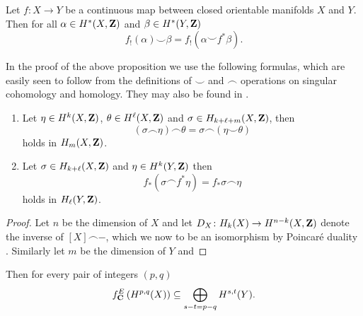 \begin{proposition}
    \label{cohomological projection formula}
    Let $f \colon X \to Y$ be a continuous map between closed orientable manifolds $X$ and $Y$. Then for all $\alpha \in H^{*}(X, \mathbf Z)$ and $\beta \in H^{*}(Y, \mathbf Z)$
    \[
        f_!(\alpha) \smallsmile \beta = f_!(\alpha \smallsmile f^*\beta).
    \]
\end{proposition}

\begin{remark}
    In the proof of the above proposition we use the following formulas, which are easily seen to follow from the definitions of $\smallsmile$ and $\smallfrown$ operations on singular cohomology and homology. They may also be found in \cite[\S VI, Theorem 5.2]{Bredon1993}.
    \begin{enumerate}[label = (\roman*)]
        \item{Let $\eta \in H^{k}(X, \mathbf Z)$, $\theta \in H^{\ell}(X, \mathbf Z)$ and $\sigma \in H_{k+\ell+m}(X, \mathbf Z)$, then 
        \[
            (\sigma \smallfrown \eta) \smallfrown \theta = 
            \sigma \smallfrown (\eta \smallsmile \theta)
        \]
        holds in $H_m(X, \mathbf Z)$.}
        \item{Let $\sigma \in H_{k + \ell}(X, \mathbf Z)$ and $\eta \in H^{k}(Y, \mathbf Z)$ then 
        \[
            f_*(\sigma \smallfrown f^*\eta) = f_*\sigma \smallfrown \eta
        \]
        holds in $H_\ell(Y, \mathbf Z)$.
        }
    \end{enumerate}
\end{remark}

\begin{proof}
    Let $n$ be the dimension of $X$ and let $D_X \colon H_k(X) \to H^{n-k}(X, \mathbf Z)$ denote the inverse of $[X] \smallfrown -$, which we now to be an isomorphism by Poincaré duality \cite[text]{keylist}. Similarly let $m$ be the dimension of $Y$ and
\end{proof}

\begin{proposition}
    \label{Hodge lattice, fm transform interaction}
    Then for every pair of integers $(p,q)$
    \begin{equation}
        \label{eq: Hodge lattice, fm transform}
        f^{E}_\mathbf C\left(H^{p,q}(X)\right) \subseteq \bigoplus_{s - t = p - q} H^{s,t}(Y).
    \end{equation}
\end{proposition}
